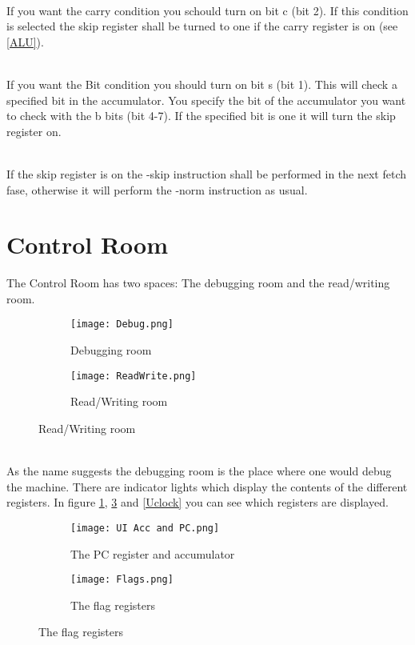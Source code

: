 \documentclass{article}
\begin{document}
~\\
If you want the carry condition you schould turn on bit c (bit 2). If this condition is selected the skip register shall be turned to one if the carry register is on (see \ref{ALU}).

~\\
If you want the Bit condition you should turn on bit s (bit 1). This will check a specified bit in the accumulator. You specify the bit of the accumulator you want to check with the b bits (bit 4-7). If the specified bit is one it will turn the skip register on.

~\\
If the skip register is on the -skip instruction shall be performed in the next fetch fase, otherwise it will perform the -norm instruction as usual.
\section{Control Room\label{UI}}
The Control Room has two spaces: The debugging room and the read/writing room.
\begin{figure}[h]
    \centering
    \begin{subfigure}{0.5\textwidth}
        \centering
        \texttt{[image: Debug.png]} %
        \caption{Debugging room}
    \end{subfigure}\hfill
    \begin{subfigure}{0.5\textwidth}
        \centering
        \texttt{[image: ReadWrite.png]} %
        \caption{Read/Writing room}
    \end{subfigure}
\end{figure}
~\\
As the name suggests the debugging room is the place where one would debug the machine. There are indicator lights which display the contents of the different registers. In figure \ref{PC}, \ref{Flag} and \ref{Uclock} you can see which registers are displayed.
\begin{figure}[h]
	\centering
	\begin{subfigure}{0.5\textwidth}
		\centering
		\texttt{[image: UI Acc and PC.png]}
		\caption{The PC register and accumulator\label{PC}}
	\end{subfigure}\hfill
	\begin{subfigure}{0.5\textwidth}
		\centering
		\texttt{[image: Flags.png]}
		\caption{The flag registers\label{Flag}}
	\end{subfigure}
\end{figure}
\end{document}
